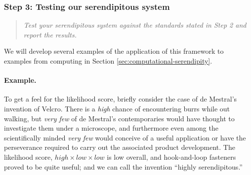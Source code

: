 \subsubsection*{Step 3: Testing our serendipitous system}

\begin{quote} {\em Test your serendipitous system against the standards stated in Step 2 and report the
results.}\end{quote}

\noindent We will develop several examples of the application of this framework
to examples from computing in Section
\ref{sec:computational-serendipity}.  

\paragraph{Example.}
To get a feel for the likelihood score, briefly consider the case of
de Mestral's invention of Velcro\texttrademark.  There is a
\emph{high} chance of encountering burrs while out walking, but
\emph{very few} of de Mestral's contemporaries would have thought to
investigate them under a microscope, and furthermore even among the
scientifically minded \emph{very few} would conceive of a useful
application or have the perseverance required to carry out the
associated product development.  The likelihood score,
$\mathit{high}\times\mathit{low}\times\mathit{low}$ is low overall,
and hook-and-loop fasteners proved to be quite useful; and we can call
the invention ``highly serendipitous.''

